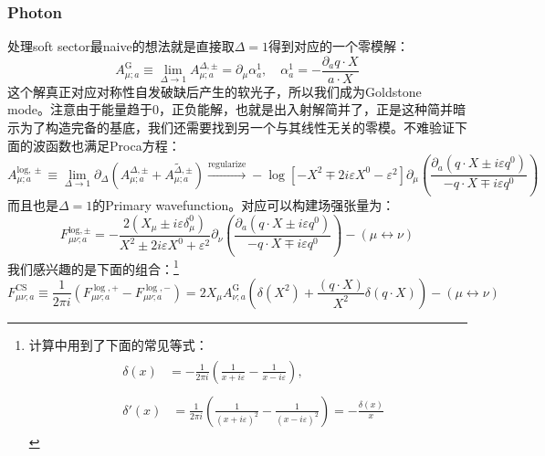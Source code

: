 \subsubsection{Photon}
处理soft sector最naive的想法就是直接取$\Delta=1$得到对应的一个零模解：
\begin{equation}
	A_{\mu;a}^\mathrm{G}\equiv\lim_{\Delta\to1}A_{\mu;a}^{\Delta,\pm}=\partial_{\mu}\alpha_{a}^1,\quad\alpha_a^1=-\frac{\partial_aq\cdot X}{a\cdot X}
\end{equation}
这个解真正对应对称性自发破缺后产生的软光子，所以我们成为Goldstone mode。注意由于能量趋于0，正负能解，也就是出入射解简并了，正是这种简并暗示为了构造完备的基底，我们还需要找到另一个与其线性无关的零模。不难验证下面的波函数也满足Proca方程：
\begin{equation}
	A_{\mu;a}^{\mathrm{log,}\pm}\equiv\lim_{\Delta\to1}\partial_\Delta\left(A_{\mu;a}^{\Delta,\pm}+\widetilde{A_{\mu;a}^{\Delta,\pm}}\right)\xrightarrow{\text{regularize}}-\log\left[-X^2\mp2i\varepsilon X^0-\varepsilon^2\right]\partial_\mu\left(\frac{\partial_a(q\cdot X\pm i\varepsilon q^0)}{-q\cdot X\mp i\varepsilon q^0}\right)
\end{equation}
而且也是$\Delta=1$的Primary wavefunction。对应可以构建场强张量为：
\begin{equation}
	F_{\mu\nu;a}^{\mathrm{log},\pm}=-\frac{2(X_\mu\pm i\varepsilon\delta_\mu^0)}{X^2\pm2i\varepsilon X^0+\varepsilon^2}\partial_\nu\left(\frac{\partial_a(q\cdot X\pm i\varepsilon q^0)}{-q\cdot X\mp i\varepsilon q^0}\right)-(\mu\leftrightarrow\nu)
\end{equation}
我们感兴趣的是下面的组合：\footnote{计算中用到了下面的常见等式：\[\begin{aligned}
		&\begin{aligned}\delta(x)&=-\frac{1}{2\pi i}\left(\frac{1}{x+i\varepsilon}-\frac{1}{x-i\varepsilon}\right),\end{aligned} \\
		&\begin{aligned}\delta'(x)&=\frac{1}{2\pi i}\left(\frac{1}{(x+i\varepsilon)^2}-\frac{1}{(x-i\varepsilon)^2}\right)=-\frac{\delta(x)}{x}\end{aligned}
	\end{aligned}\]}
\begin{equation}
	F_{\mu\nu;a}^\mathrm{CS}\equiv\frac1{2\pi i}\left(F_{\mu\nu;a}^{\log,+}-F_{\mu\nu;a}^{\log,-}\right)=2X_{\mu}A_{\nu;a}^\mathrm{G}\left(\delta\left(X^2\right)+\frac{(q\cdot X)}{X^2}\delta(q\cdot X)\right)-(\mu\leftrightarrow\nu)
\end{equation}
